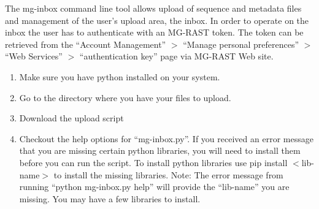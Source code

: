 \documentclass[letterpaper,10pt,english]{sphinxmanual}
\begin{document}
The mg-inbox command line tool allows upload of sequence and metadata
files and management of the user’s upload area, the inbox. In order to
operate on the inbox the user has to authenticate with an MG-RAST token.
The token can be retrieved from the “Account Management” \textendash{}\(>\)
“Manage personal preferences” \textendash{}\(>\) “Web Services” \textendash{}\(>\)
“authentication key” page via MG-RAST Web site.
\begin{enumerate}
\def\theenumi{\arabic{enumi}}
\def\labelenumi{\theenumi .}
\makeatletter\def\p@enumii{\p@enumi \theenumi .}\makeatother
\item {} 
Make sure you have python installed on your system.

\begin{sphinxVerbatim}[commandchars=\\\{\}]
\end{sphinxVerbatim}

\item {} 
Go to the directory where you have your files to upload.

\item {} 
Download the upload script

\begin{sphinxVerbatim}[commandchars=\\\{\}]
\end{sphinxVerbatim}

\item {} 
Checkout the help options for “mg-inbox.py”. If you received an error
message that you are missing certain python libraries, you will need
to install them before you can run the script. To install python
libraries use pip install \(<\)lib-name\(>\) to install
the missing libraries. Note: The error message from running “python
mg-inbox.py \textendash{}help” will provide the “lib-name” you are missing. You
may have a few libraries to install.

\begin{sphinxVerbatim}[commandchars=\\\{\}]
  
\end{sphinxVerbatim}


\end{enumerate}
\end{document}
